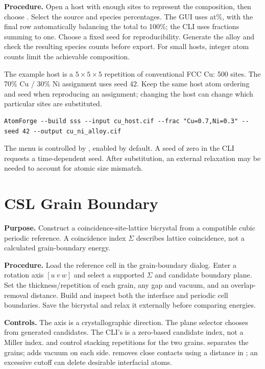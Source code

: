 \textbf{Procedure.} Open a host with enough sites to represent the composition, then choose . Select the source and species percentages. The GUI uses at\%, with the final row automatically balancing the total to 100\%; the CLI uses fractions summing to one. Choose a fixed seed for reproducibility. Generate the alloy and check the resulting species counts before export. For small hosts, integer atom counts limit the achievable composition.

The example host is a $5\times5\times5$ repetition of conventional FCC Cu: 500 sites. The 70\% Cu / 30\% Ni assignment uses seed 42. Keep the same host atom ordering and seed when reproducing an assignment; changing the host can change which particular sites are substituted.
\begin{lstlisting}
AtomForge --build sss --input cu_host.cif --frac "Cu=0.7,Ni=0.3" --seed 42 --output cu_ni_alloy.cif
\end{lstlisting}
The menu is controlled by , enabled by default. A seed of zero in the CLI requests a time-dependent seed. After substitution, an external relaxation may be needed to account for atomic size mismatch.

\section{CSL Grain Boundary}
\textbf{Purpose.} Construct a coincidence-site-lattice bicrystal from a compatible cubic periodic reference. A coincidence index $\Sigma$ describes lattice coincidence, not a calculated grain-boundary energy.

\textbf{Procedure.} Load the reference cell in the grain-boundary dialog. Enter a rotation axis $[u\ v\ w]$ and select a supported $\Sigma$ and candidate boundary plane. Set the thickness/repetition of each grain, any gap and vacuum, and an overlap-removal distance. Build and inspect both the interface and periodic cell boundaries. Save the bicrystal and relax it externally before comparing energies.

\textbf{Controls.} The axis is a crystallographic direction. The plane selector chooses from generated candidates. The CLI's  is a zero-based candidate index, not a Miller index.  and  control stacking repetitions for the two grains.  separates the grains;  adds vacuum on each side.  removes close contacts using a distance in \angstrom; an excessive cutoff can delete desirable interfacial atoms.

